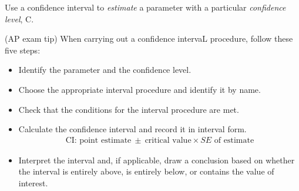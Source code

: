 Use a confidence interval to \emph{estimate} a parameter with a particular \emph{confidence level}, C.

\begin{onebox}{(AP exam tip) When carrying out a confidence intervaL procedure, follow these five steps:}
\begin{itemize}
\setlength{\itemsep}{0mm}
\item {}  Identify the parameter and the confidence level.
\item  {}  Choose the appropriate interval procedure and identify it by name.
\item  {}  Check that the conditions for the interval procedure are met. 
\item {} Calculate the confidence interval and record it in interval form.  
\begin{align*}
\text{CI:  point estimate}\ \pm\  \text{critical value}\times SE \text{ of estimate}
\end{align*}
\item {} Interpret the interval and, if applicable, draw a conclusion based on whether the interval is entirely above, is entirely below, or contains the value of interest.
\end{itemize}\end{onebox}



\textA{\newpage}

